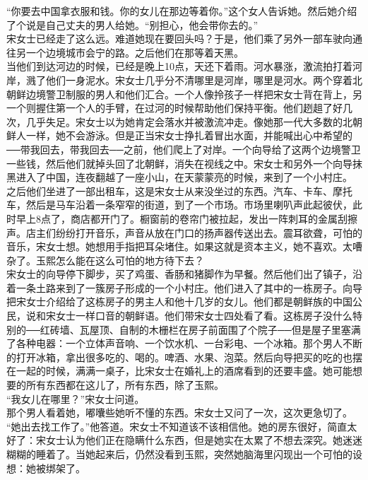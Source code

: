 “你要去中国拿衣服和钱。你的女儿在那边等着你。”这个女人告诉她。然后她介绍了个说是自己丈夫的男人给她。“别担心，他会带你去的。”\\

宋女士已经走了这么远。难道她现在要回头吗？于是，他们乘了另外一部车驶向通往另一个边境城市会宁的路。之后他们在那等着天黑。\\

当他们到达河边的时候，已经是晚上10点，天还下着雨。河水暴涨，激流拍打着河岸，溅了他们一身泥水。宋女士几乎分不清哪里是河岸，哪里是河水。两个穿着北朝鲜边境警卫制服的男人和他们汇合。一个人像拎孩子一样把宋女士背在背上，另一个则握住第一个人的手臂，在过河的时候帮助他们保持平衡。他们趔趄了好几次，几乎失足。宋女士以为她肯定会落水并被激流冲走。像她那一代大多数的北朝鲜人一样，她不会游泳。但是正当宋女士挣扎着冒出水面，并能喊出心中希望的──带我回去，带我回去──之前，他们爬上了对岸。一个向导给了这两个边境警卫一些钱，然后他们就掉头回了北朝鲜，消失在视线之中。宋女士和另外一个向导抹黑进入了中国，连夜翻越了一座小山，在天蒙蒙亮的时候，来到了一个小村庄。\\

之后他们坐进了一部出租车，这是宋女士从来没坐过的东西。汽车、卡车、摩托车，然后是马车沿着一条窄窄的街道，到了一个市场。市场里喇叭声此起彼伏，此时早上8点了，商店都开门了。橱窗前的卷帘门被拉起，发出一阵刺耳的金属刮擦声。店主们纷纷打开音乐，声音从放在门口的扬声器传送出去。震耳欲聋，可怕的音乐，宋女士想。她想用手指把耳朵堵住。如果这就是资本主义，她不喜欢。太嘈杂了。玉熙怎么能在这么可怕的地方待下去？\\

宋女士的向导停下脚步，买了鸡蛋、香肠和猪脚作为早餐。然后他们出了镇子，沿着一条土路来到了一簇房子形成的一个小村庄。他们进入了其中的一栋房子。向导把宋女士介绍给了这栋房子的男主人和他十几岁的女儿。他们都是朝鲜族的中国公民，说和宋女士一样口音的朝鲜语。他们带宋女士四处看了看。这栋房子没什么特别的──红砖墙、瓦屋顶、自制的木栅栏在房子前面围了个院子──但是屋子里塞满了各种电器：一个立体声音响、一个饮水机、一台彩电、一个冰箱。那个男人不断的打开冰箱，拿出很多吃的、喝的。啤酒、水果、泡菜。然后向导把买的吃的也摆在一起的时候，满满一桌子，比宋女士在婚礼上的酒席看到的还要丰盛。她可能想要的所有东西都在这儿了，所有东西，除了玉熙。\\

“我女儿在哪里？”宋女士问道。\\

那个男人看着她，嘟囔些她听不懂的东西。宋女士又问了一次，这次更急切了。\\

“她出去找工作了。”他答道。宋女士不知道该不该相信他。她的房东很好，简直太好了：宋女士认为他们正在隐瞒什么东西，但是她实在太累了不想去深究。她迷迷糊糊的睡着了。当她起来后，仍然没看到玉熙，突然她脑海里闪现出一个可怕的设想：她被绑架了。\\


